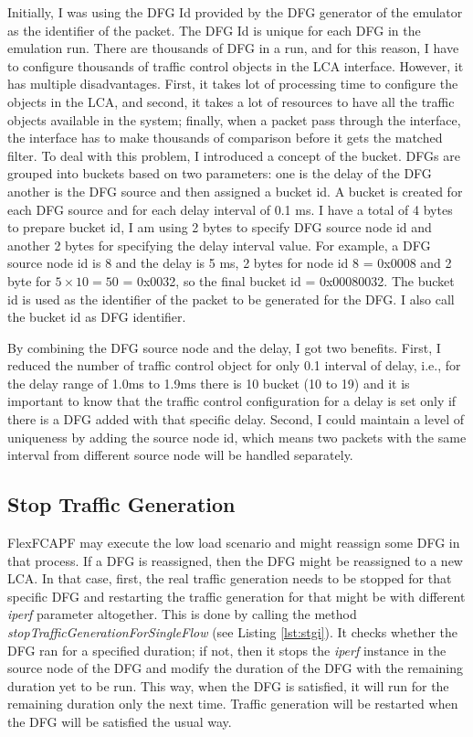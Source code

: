Initially, I was using the DFG Id provided by the DFG generator of the emulator as the identifier of the packet. The DFG Id is unique for each DFG in the emulation run. There are thousands of DFG in a run, and for this reason, I have to configure thousands of traffic control objects in the LCA interface. However, it has multiple disadvantages. First, it takes lot of processing time to configure the objects in the LCA, and second, it takes a lot of resources to have all the traffic objects available in the system; finally, when a packet pass through the interface, the interface has to make thousands of comparison before it gets the matched filter. To deal with this problem, I introduced a concept of the bucket. DFGs are grouped into buckets based on two parameters: one is the delay of the DFG another is the DFG source and then assigned a bucket id. A bucket is created for each DFG source and for each delay interval of 0.1 ms. I have a total of 4 bytes to prepare bucket id, I am using 2 bytes to specify DFG source node id and another 2 bytes for specifying the delay interval value. For example, a DFG source node id is 8 and the delay is 5 ms, 2 bytes for node id 8 = 0x0008 and 2 byte for $5\times10 = 50$ = 0x0032, so the final bucket id = 0x00080032. The bucket id is used as the identifier of the packet to be generated for the DFG. I also call the bucket id as DFG identifier.

By combining the DFG source node and the delay, I got two benefits. First, I reduced the number of traffic control object for only 0.1 interval of delay, i.e., for the delay range of 1.0ms to 1.9ms there is 10 bucket (10 to 19) and it is important to know that the traffic control configuration for a delay is set only if there is a DFG added with that specific delay. Second, I could maintain a level of uniqueness by adding the source node id, which means two packets with the same interval from different source node will be handled separately.

\subsection{Stop Traffic Generation}
FlexFCAPF may execute the low load scenario and might reassign some DFG in that process. If a DFG is reassigned, then the DFG might be reassigned to a new LCA. In that case, first, the real traffic generation needs to be stopped for that specific DFG and restarting the traffic generation for that might be with different \textit{iperf} parameter altogether. This is done by calling the method \textit{stopTrafficGenerationForSingleFlow} (see Listing \ref{lst:stgi}). It checks whether the DFG ran for a specified duration; if not, then it stops the \textit{iperf} instance in the source node of the DFG and modify the duration of the DFG with the remaining duration yet to be run. This way, when the DFG is satisfied, it will run for the remaining duration only the next time. Traffic generation will be restarted when the DFG will be satisfied the usual way.

